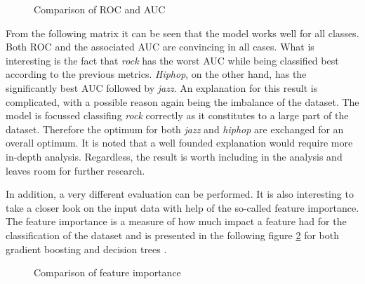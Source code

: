   \begin{figure}[H]
    \centering
    \qquad
    \caption{Comparison of ROC and AUC}%
    \label{fig:roc_and_auc_for_gb_and_dt}%
\end{figure}

From the following matrix it can be seen that the model works well for all classes. Both \ac{ROC} and the associated \ac{AUC} are convincing 
in all cases. What is interesting is the fact that \emph{rock} has the worst \ac{AUC} while being classified best according to the previous metrics.
\emph{Hiphop}, on the other hand, has the significantly best \ac{AUC} followed by \emph{jazz}. An explanation for this result is complicated, with a 
possible reason again being the imbalance of the dataset. The model is focussed classifing \emph{rock} correctly as it constitutes to a large part of the 
dataset. Therefore the optimum for both \emph{jazz} and \emph{hiphop} are exchanged for an overall optimum. It is noted that a well founded 
explanation would require more in-depth analysis. Regardless, the result is worth including in the analysis and leaves room for 
further research.   

In addition, a very different evaluation can be performed. It is also interesting to take a closer look on the input data with help of 
the so-called feature importance. The feature importance is a measure of how much impact a feature had for the classification of the 
dataset and is presented in the following figure \ref{fig:feature_inportance_for_gb_and_dt} for both gradient boosting and decision trees \cite{scikit-learn_feature_importance}. 

\begin{figure}[H]
  \centering
  \qquad
  \caption{Comparison of feature importance}%
  \label{fig:feature_inportance_for_gb_and_dt}%
\end{figure}

